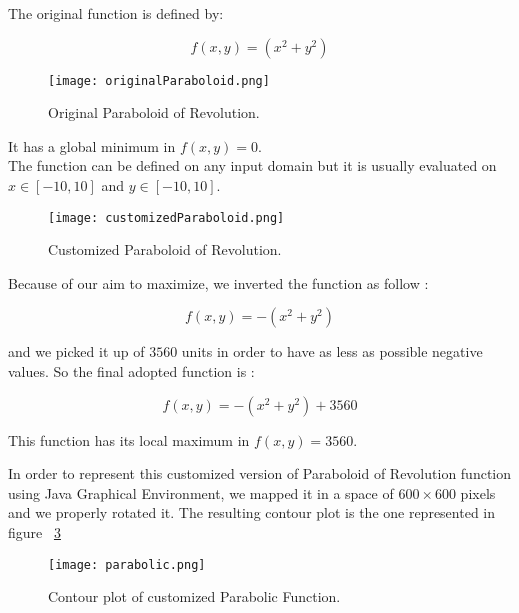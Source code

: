 The original function is defined by: 

\begin{equation}
f(x, y) = (x^2 + y^2) 
\end{equation}

\begin{figure}[h!]
	\centering
	\texttt{[image: originalParaboloid.png]}
	\caption{Original Paraboloid of Revolution.}
	\label{fig:OriginalParaboloidOfRevolution}
\end{figure}

It has a global minimum in $f(x, y) = 0$. \\

The function can be defined on any input domain but it is usually evaluated on $x \in [-10, 10]$ and $y \in [-10, 10]$. 

\pagebreak

\begin{figure}[h!]
	\centering
	\texttt{[image: customizedParaboloid.png]}
	\caption{Customized Paraboloid of Revolution.}
	\label{fig:CustomizedParaboloidOfRevolution}
\end{figure}

Because of our aim to maximize, we inverted the function as follow :

\begin{equation}
f(x, y) = -(x^2 + y^2)
\end{equation}

and we picked it up of $3560$ units in order to have as less as possible negative values. So the final adopted function is :

\begin{equation}
f(x, y) = -(x^2 + y^2) + 3560
\end{equation}

This function has its local maximum in $f(x, y) = 3560$.

In order to represent this customized version of Paraboloid of Revolution function using Java Graphical Environment, we mapped it in a space of $600 \times 600$ pixels and we properly rotated it. The resulting contour plot is the one represented in figure ~\ref{fig:ContourPlotCustomizedParabolicFunction} 

\begin{figure}[h!]
	\centering
	\texttt{[image: parabolic.png]}
	\caption{Contour plot of customized Parabolic Function.}
	\label{fig:ContourPlotCustomizedParabolicFunction}
\end{figure}

